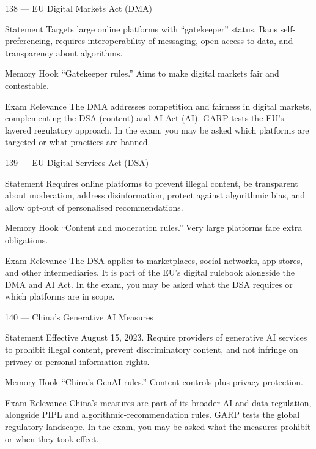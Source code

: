 \documentclass[aspectratio=169,8pt]{beamer}
\begin{document}
	\begin{frame}{138 --- EU Digital Markets Act (DMA)}
		\begin{block}{Statement}
			Targets large online platforms with ``gatekeeper'' status. Bans self-preferencing, requires interoperability of messaging, open access to data, and transparency about algorithms.
		\end{block}
		\begin{block}{Memory Hook}
			``Gatekeeper rules.'' Aims to make digital markets fair and contestable.
		\end{block}
		\begin{block}{Exam Relevance}
			The DMA addresses competition and fairness in digital markets, complementing the DSA (content) and AI Act (AI). GARP tests the EU's layered regulatory approach. In the exam, you may be asked which platforms are targeted or what practices are banned.
		\end{block}
	\end{frame}
	
	\begin{frame}{139 --- EU Digital Services Act (DSA)}
		\begin{block}{Statement}
			Requires online platforms to prevent illegal content, be transparent about moderation, address disinformation, protect against algorithmic bias, and allow opt-out of personalised recommendations.
		\end{block}
		\begin{block}{Memory Hook}
			``Content and moderation rules.'' Very large platforms face extra obligations.
		\end{block}
		\begin{block}{Exam Relevance}
			The DSA applies to marketplaces, social networks, app stores, and other intermediaries. It is part of the EU's digital rulebook alongside the DMA and AI Act. In the exam, you may be asked what the DSA requires or which platforms are in scope.
		\end{block}
	\end{frame}
	
	\begin{frame}{140 --- China's Generative AI Measures}
		\begin{block}{Statement}
			Effective August 15, 2023. Require providers of generative AI services to prohibit illegal content, prevent discriminatory content, and not infringe on privacy or personal-information rights.
		\end{block}
		\begin{block}{Memory Hook}
			``China's GenAI rules.'' Content controls plus privacy protection.
		\end{block}
		\begin{block}{Exam Relevance}
			China's measures are part of its broader AI and data regulation, alongside PIPL and algorithmic-recommendation rules. GARP tests the global regulatory landscape. In the exam, you may be asked what the measures prohibit or when they took effect.
		\end{block}
	\end{frame}
	
\end{document}

